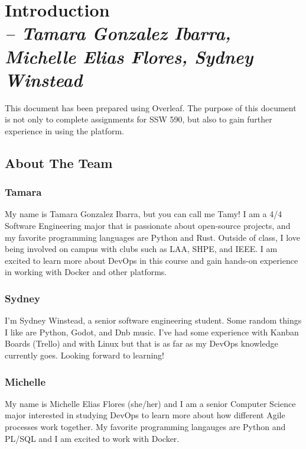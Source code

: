 \chapter{Introduction \\
\small{\textit{-- Tamara Gonzalez Ibarra, Michelle Elias Flores, Sydney Winstead}}
\label{Chapter::Introduction}}

 
This document has been prepared using Overleaf. The purpose of this document is not only to complete assignments for SSW 590, but also to gain further experience in using the platform.

\section{About The Team}

\subsection{Tamara}
My name is Tamara Gonzalez Ibarra, but you can call me Tamy! I am a 4/4 Software Engineering major that is passionate about open-source projects, and my favorite programming languages are Python and Rust. Outside of class, I love being involved on campus with clubs such as LAA, SHPE, and IEEE. I am excited to learn more about DevOps in this course and gain hands-on experience in working with Docker and other platforms. 

\subsection{Sydney}
I'm Sydney Winstead, a senior software engineering student. Some random things I like are Python, Godot, and Dnb music. I've had some experience with Kanban Boards (Trello) and with Linux but that is as far as my DevOps knowledge currently goes. Looking forward to learning!

\subsection{Michelle}
My name is Michelle Elias Flores (she/her) and I am a senior Computer Science major interested in studying DevOps to learn more about how different Agile processes work together. My favorite programming langauges are Python and PL/SQL and I am excited to work with Docker.
